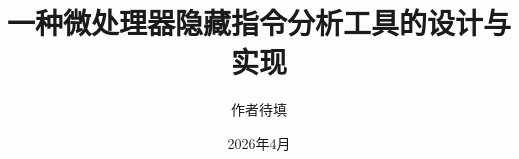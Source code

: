 \documentclass[UTF8,zihao=-4]{ctexrep}
\title{一种微处理器隐藏指令分析工具的设计与实现}
\author{作者待填}
\date{2026年4月}
\begin{document}
\maketitle

\begin{abstract}

\end{abstract}

\tableofcontents













\appendix

\end{document}

